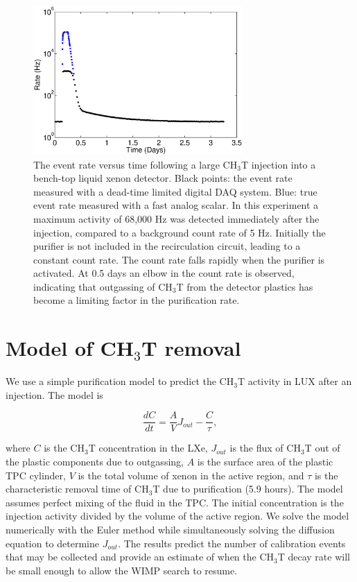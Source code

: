 \begin{figure}[h!]
\includegraphics[width=80mm]{fig/TimeHisto_Analog2.eps}
\caption{The event rate versus time following a large CH$_3$T injection into a bench-top liquid xenon detector. Black points: the event rate measured with a dead-time limited digital DAQ system. Blue: true event rate measured with a fast analog scalar. In this experiment a maximum activity of 68,000 Hz was detected immediately after the injection, compared to a background count rate of 5 Hz. Initially the purifier is not included in the recirculation circuit, leading to a constant count rate. The count rate falls rapidly when the purifier is activated. At 0.5 days an elbow in the count rate is observed, indicating that outgassing of CH$_3$T from the detector plastics has become a limiting factor in the purification rate. }
\label{fig:Density}
\end{figure}


\section{Model of CH$_3$T removal}
\label{sec:appendix2}

We use a simple purification model to predict the CH$_3$T activity in LUX after an injection. The model is 

\begin{equation}
\frac{dC}{dt} = \frac{A}{V}J_{out} -\frac{C}{\tau},
\end{equation}

\noindent where  $C$ is the CH$_3$T concentration in the LXe,  $J_{out}$ is the flux of CH$_3$T out of the plastic components due to outgassing,  $A$ is the surface area of the plastic TPC cylinder, $V$ is the total volume of xenon in the active region, and $\tau$ is the characteristic removal time of CH$_3$T due to purification (5.9 hours). The model assumes perfect mixing of the fluid in the TPC. The initial concentration is the injection activity divided by the volume of the active region. We solve the model numerically with the Euler method while simultaneously solving the diffusion equation to determine $J_{out}$. The results predict the number of calibration events that may be collected and provide an estimate of when the CH$_3$T  decay rate will be small enough to allow the WIMP search to resume.

